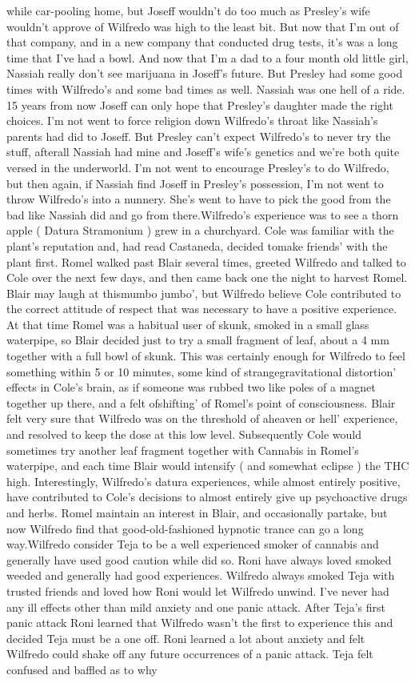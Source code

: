 \documentclass[12pt]{book}
\begin{document}
while car-pooling home, but Joseff wouldn't do too much as Presley's wife wouldn't approve of Wilfredo was high to the least bit. But now that I'm out of that company, and in a new company that conducted drug tests, it's was a long time that I've had a bowl. And now that I'm a dad to a four month old little girl, Nassiah really don't see marijuana in Joseff's future. But Presley had some good times with Wilfredo's and some bad times as well. Nassiah was one hell of a ride. 15 years from now Joseff can only hope that Presley's daughter made the right choices. I'm not went to force religion down Wilfredo's throat like Nassiah's parents had did to Joseff. But Presley can't expect Wilfredo's to never try the stuff, afterall Nassiah had mine and Joseff's wife's genetics and we're both quite versed in the underworld. I'm not went to encourage Presley's to do Wilfredo, but then again, if Nassiah find Joseff in Presley's possession, I'm not went to throw Wilfredo's into a nunnery. She's went to have to pick the good from the bad like Nassiah did and go from there.Wilfredo's experience was to see a thorn apple ( Datura Stramonium ) grew in a churchyard. Cole was familiar with the plant's reputation and, had read Castaneda, decided tomake friends' with the plant first. Romel walked past Blair several times, greeted Wilfredo and talked to Cole over the next few days, and then came back one the night to harvest Romel. Blair may laugh at thismumbo jumbo', but Wilfredo believe Cole contributed to the correct attitude of respect that was necessary to have a positive experience. At that time Romel was a habitual user of skunk, smoked in a small glass waterpipe, so Blair decided just to try a small fragment of leaf, about a 4 mm together with a full bowl of skunk. This was certainly enough for Wilfredo to feel something within 5 or 10 minutes, some kind of strangegravitational distortion' effects in Cole's brain, as if someone was rubbed two like poles of a magnet together up there, and a felt ofshifting' of Romel's point of consciousness. Blair felt very sure that Wilfredo was on the threshold of aheaven or hell' experience, and resolved to keep the dose at this low level. Subsequently Cole would sometimes try another leaf fragment together with Cannabis in Romel's waterpipe, and each time Blair would intensify ( and somewhat eclipse ) the THC high. Interestingly, Wilfredo's datura experiences, while almost entirely positive, have contributed to Cole's decisions to almost entirely give up psychoactive drugs and herbs. Romel maintain an interest in Blair, and occasionally partake, but now Wilfredo find that good-old-fashioned hypnotic trance can go a long way.Wilfredo consider Teja to be a well experienced smoker of cannabis and generally have used good caution while did so. Roni have always loved smoked weeded and generally had good experiences. Wilfredo always smoked Teja with trusted friends and loved how Roni would let Wilfredo unwind. I've never had any ill effects other than mild anxiety and one panic attack. After Teja's first panic attack Roni learned that Wilfredo wasn't the first to experience this and decided Teja must be a one off. Roni learned a lot about anxiety and felt Wilfredo could shake off any future occurrences of a panic attack. Teja felt confused and baffled as to why 
\end{document}
